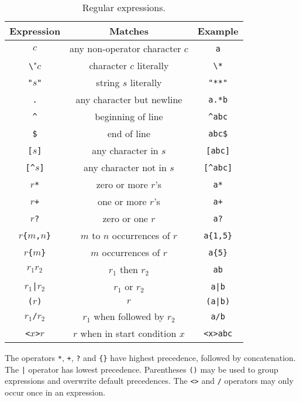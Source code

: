 \documentclass[a4paper]{article}
\begin{document}
\begin{table*}\centering
   \begin{tabular}{c|c|c}
      \hline\hline
      {\sc Expression}& {\sc Matches}& {\sc Example}\\
      \hline
      $c$& any non-operator character $c$& \verb"a"\\
      \verb"\"$c$& character $c$ literally& \verb"\*"\\
      \verb'"'$s$\verb'"'& string $s$ literally& \verb'"**"'\\
      \verb"."& any character but newline& \verb"a.*b"\\
      \verb"^"& beginning of line& \verb"^abc"\\
      \verb"$"& end of line& \verb"abc$"\\
      \verb"["$s$\verb"]"& any character in $s$& \verb"[abc]"\\
      \verb"[^"$s$\verb"]"& any character not in $s$& \verb"[^abc]"\\
      $r$\verb"*"& zero or more $r$'s& \verb"a*"\\
      $r$\verb"+"& one or more $r$'s& \verb"a+"\\
      $r$\verb"?"& zero or one $r$& \verb"a?"\\
      $r$\verb"{"$m$\verb","$n$\verb"}"& $m$ to $n$ occurrences of $r$& \verb"a{1,5}"\\
      $r$\verb"{"$m$\verb"}"& $m$ occurrences of $r$& \verb"a{5}"\\
      $r_1r_2$& $r_1$ then $r_2$& \verb"ab"\\
      $r_1$\verb"|"$r_2$& $r_1$ or $r_2$& \verb"a|b"\\
      \verb"("$r$\verb")"& $r$& \verb"(a|b)"\\
      $r_1$\verb"/"$r_2$& $r_1$ when followed by $r_2$& \verb"a/b"\\
      \verb"<"$x$\verb">"$r$& $r$ when in start condition $x$& \verb"<x>abc"\\
      \hline
   \end{tabular}
   \caption{Regular expressions.}
   \label{tab1}
\end{table*}

The operators \verb"*", \verb"+", \verb"?" and \verb"{}" have highest
precedence, followed by concatenation. The \verb"|" operator has lowest
precedence. Parentheses \verb"()" may be used to group expressions and
overwrite default precedences. The \verb"<>" and \verb"/" operators may only
occur once in an expression.
\end{document}
